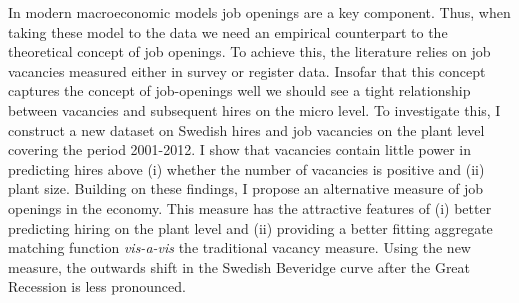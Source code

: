 In modern macroeconomic models job openings are a key component. Thus, when taking these model to the data we need an empirical counterpart to the theoretical concept of job openings. To achieve this, the literature relies on job vacancies measured either in survey or register data. Insofar that this concept captures the concept of job-openings well we should see a tight relationship between vacancies and subsequent hires on the micro level. To investigate this, I construct a new dataset on Swedish hires and job vacancies on the plant level covering the period 2001-2012. I show that vacancies contain little power in predicting hires above (i) whether the number of vacancies is positive and (ii) plant size. Building on these findings, I propose an alternative measure of job openings in the economy. This measure has the attractive features of (i) better predicting hiring on the plant level and (ii) providing a better fitting aggregate matching function \emph{vis-a-vis} the traditional vacancy measure. Using the new measure, the outwards shift in the Swedish Beveridge curve after the Great Recession is less pronounced.

